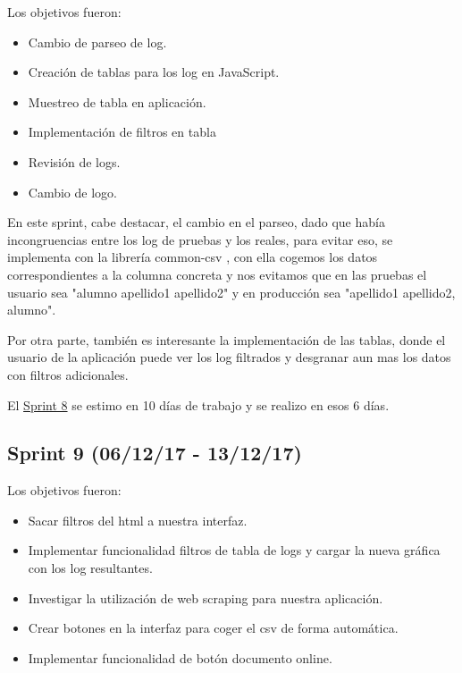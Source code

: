 Los objetivos fueron:
\begin{itemize}
	\tightlist
	\item
	Cambio de parseo de log.
	\item
	Creación de tablas para los log en JavaScript.
	\item
	Muestreo de tabla en aplicación.
	\item
	Implementación de filtros en tabla
	\item
	Revisión de logs.
	\item
	Cambio de logo.
	
\end{itemize}

En este sprint, cabe destacar, el cambio en el parseo, dado que había incongruencias entre los log de pruebas y los reales, para evitar eso, se implementa con la librería common-csv \cite{Java:csv}, con ella cogemos los datos correspondientes a la columna concreta y nos evitamos que en las pruebas el usuario sea "alumno apellido1 apellido2" y en producción sea "apellido1 apellido2, alumno".

Por otra parte, también es interesante la implementación de las tablas, donde el usuario de la aplicación puede ver los log filtrados y desgranar aun mas los datos con filtros adicionales.

El \href{https://github.com/trona85/GII-17.1B-UBULog-1.0/milestone/8?closed=1}{Sprint 8} se estimo en 10 días de trabajo y se realizo en esos 6 días.


\subsection{Sprint 9 (06/12/17 -
	13/12/17)}\label{sprint-9-061217---131217}

Los objetivos fueron:
\begin{itemize}
	\tightlist
	\item
	Sacar filtros del html a nuestra interfaz.
	\item
	Implementar funcionalidad filtros de tabla de logs y cargar la nueva gráfica con los log resultantes.
	\item
	Investigar la utilización de web scraping para nuestra aplicación.
	\item
	Crear botones en la interfaz para coger el csv de forma automática.
	\item
	Implementar funcionalidad de botón documento online.
	
\end{itemize}

